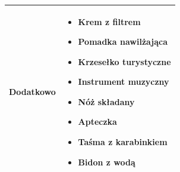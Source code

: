 \begin{tabular}{>{\bfseries}p{3cm} p{10cm}}
Dodatkowo &
\begin{itemize}[leftmargin=*, nosep, topsep=0pt]
  \item Krem z filtrem
  \item Pomadka nawilżająca
  \item Krzesełko turystyczne
  \item Instrument muzyczny
  \item Nóż składany
  \item Apteczka
  \item Taśma z karabinkiem
  \item Bidon z wodą
\end{itemize} \\
\bottomrule
\end{tabular}